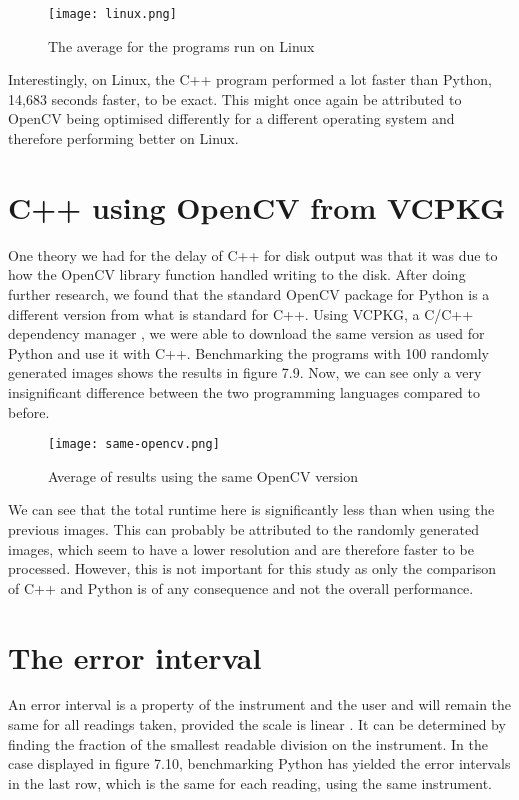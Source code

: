 \begin{figure}[H]
	\centering
	\texttt{[image: linux.png]}
	\caption{The average for the programs run on Linux}
	\label{figure:linux}
\end{figure}

Interestingly, on Linux, the C++ program performed a lot faster than Python, 14,683 seconds faster, to be exact. This might once again be attributed to OpenCV being optimised differently for a different operating system and therefore performing better on Linux.

\section{C++ using OpenCV from VCPKG}
One theory we had for the delay of C++ for disk output was that it was due to how the OpenCV library function handled writing to the disk. After doing further research, we found that the standard OpenCV package for Python is a different version from what is standard for C++. Using VCPKG, a C/C++ dependency manager \cite{vcpkg}, we were able to download the same version as used for Python and use it with C++. Benchmarking the programs with 100 randomly generated images shows the results in figure 7.9. Now, we can see only a very insignificant difference between the two programming languages compared to before.

\begin{figure}[H]
	\centering
	\texttt{[image: same-opencv.png]}
	\caption{Average of results using the same OpenCV version}
	\label{figure:same-opencv}
\end{figure}

We can see that the total runtime here is significantly less than when using the previous images. This can probably be attributed to the randomly generated images, which seem to have a lower resolution and are therefore faster to be processed. However, this is not important for this study as only the comparison of C++ and Python is of any consequence and not the overall performance.

\section{The error interval}
An error interval is a property of the instrument and the user and will remain the same for all readings taken, provided the scale is linear \cite{errorinterval}. It can be determined by finding the fraction of the smallest readable division on the instrument. In the case displayed in figure 7.10, benchmarking Python has yielded the error intervals in the last row, which is the same for each reading, using the same instrument.

